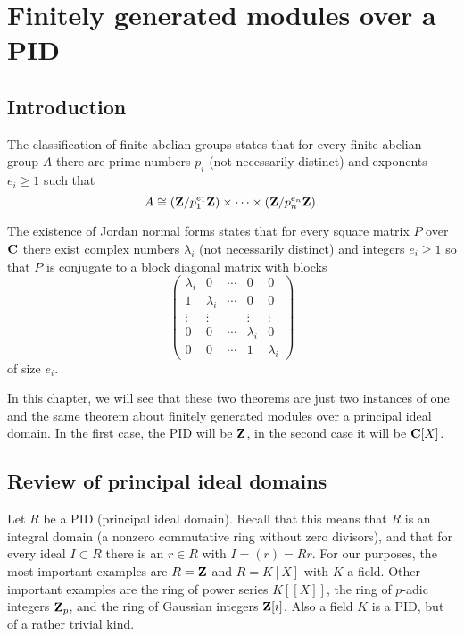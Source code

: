 
\chapter{Finitely generated modules over a PID}\label{ch:modules-over-PID}

\section{Introduction}



The classification of finite abelian groups states that for every finite abelian group $A$ there are prime numbers $p_i$ (not necessarily distinct) and exponents $e_i\geq 1$ such that
\[
	A \cong ({\mathbf{Z}}/p_1^{e_1}{\mathbf{Z}}) \times \cdots \times ({\mathbf{Z}}/p_n^{e_n}{\mathbf{Z}}).
 \]
 
 The existence of Jordan normal forms states that for every square matrix $P$ over ${\mathbf{C}}$ there exist
 complex numbers $\lambda_i$ (not necessarily distinct) and integers $e_i \geq 1$ so that
 $P$ is conjugate to a block diagonal matrix with blocks
\[
\left(\begin{matrix} \lambda_i & 0 &   \cdots & 0 & 0 \\ 
	1 & \lambda_i &  \cdots & 0 & 0 \\
	\vdots & \vdots &  & \vdots & \vdots \\ 
	0 & 0 &  \cdots & \lambda_i & 0 \\
	0 & 0 &   \cdots & 1& \lambda_i \end{matrix} \right)
\] 
of size $e_i$.
 
In this chapter, we will see that these two theorems are just two instances of one and the same theorem about finitely generated modules over a principal  ideal domain. In the first case, the PID will be ${\mathbf{Z}}$, in the second case it will be ${\mathbf{C}}[X]$.



\section{Review of principal ideal domains}

Let $R$ be a PID (principal ideal domain). Recall that this means that $R$ is an integral domain (a nonzero commutative ring without zero divisors), and that for every ideal $I\subset R$ there is an $r\in R$ with $I=(r)=Rr$. For our purposes, the most important examples are $R={\mathbf{Z}}$ and $R=K[X]$ with $K$ a field. Other important examples are the ring of power series $K[[X]]$, the ring of $p$-adic integers ${\mathbf{Z}}_p$, and the ring of Gaussian integers ${\mathbf{Z}}[i]$. Also a field $K$ is a PID, but of a rather trivial kind.

